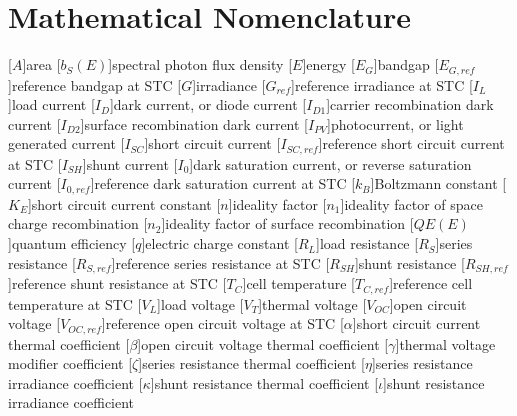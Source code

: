 \chapter{Mathematical Nomenclature}\label{appendix:math_nomenclature}

\begin{acronym}
    [$A$]{area}
    [$b_S(E)$]{spectral photon flux density}
    [$E$]{energy}
    [$E_G$]{bandgap}
    [$E_{G,ref}$]{reference bandgap at STC}
    [$G$]{irradiance}
    [$G_{ref}$]{reference irradiance at STC}
    [$I_L$]{load current}
    [$I_D$]{dark current, or diode current}
    [$I_{D1}$]{carrier recombination dark current}
    [$I_{D2}$]{surface recombination dark current}
    [$I_{PV}$]{photocurrent, or light generated current}
    [$I_{SC}$]{short circuit current}
    [$I_{SC,ref}$]{reference short circuit current at STC}
    [$I_{SH}$]{shunt current}
    [$I_0$]{dark saturation current, or reverse saturation current}
    [$I_{0,ref}$]{reference dark saturation current at STC}
    [$k_B$]{Boltzmann constant}
    [$K_E$]{short circuit current constant}
    [$n$]{ideality factor}
    [$n_1$]{ideality factor of space charge recombination}
    [$n_2$]{ideality factor of surface recombination}
    [$QE(E)$]{quantum efficiency}
    [$q$]{electric charge constant}
    [$R_L$]{load resistance}
    [$R_S$]{series resistance}
    [$R_{S,ref}$]{reference series resistance at STC}
    [$R_{SH}$]{shunt resistance}
    [$R_{SH,ref}$]{reference shunt resistance at STC}
    [$T_C$]{cell temperature}
    [$T_{C,ref}$]{reference cell temperature at STC}
    [$V_L$]{load voltage}
    [$V_T$]{thermal voltage}
    [$V_{OC}$]{open circuit voltage}
    [$V_{OC,ref}$]{reference open circuit voltage at STC}
    [$\alpha$]{short circuit current thermal coefficient}
    [$\beta$]{open circuit voltage thermal coefficient}
    [$\gamma$]{thermal voltage modifier coefficient}
    [$\zeta$]{series resistance thermal coefficient}
    [$\eta$]{series resistance irradiance coefficient}
    [$\kappa$]{shunt resistance thermal coefficient}
    [$\iota$]{shunt resistance irradiance coefficient}
\end{acronym}